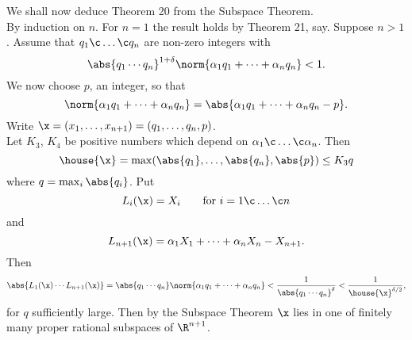 We shall now deduce Theorem 20 from the Subspace Theorem. \\
\pf By induction on $n$.  For $n=1$ the result holds by Theorem 21, say.  Suppose $n>1$.  Assume that $q_1\c \dotsc\c q_n$ are non-zero integers with
\[ \abs{q_1\dotsm q_n}^{1+\delta} \norm{\alpha_1q_1+\dotsb+\alpha_nq_n} < 1 . \]
We now choose $p$, an integer, so that
\[ \norm{\alpha_1q_1+\dotsb+\alpha_nq_n} = \abs{\alpha_1q_1+\dotsb+\alpha_nq_n-p} . \]
Write $\x=(x_1,\dotsc,x_{n+1})=(q_1,\dotsc,q_n,p)$. \\
Let $K_3$, $K_4$ be positive numbers which depend on $\alpha_1\c \dotsc\c \alpha_n$.  Then
\[ \house{\x} = \max(\abs{q_1},\dotsc,\abs{q_n},\abs{p}) \leq K_3 q \]
where $q=\max_i\abs{q_i}$.  Put
\[ L_i(\x) = X_i \qquad\text{for $i=1\c \dotsc\c n$} \]
and
\[ L_{n+1}(\x) = \alpha_1X_1 + \dotsb + \alpha_nX_n - X_{n+1} . \]
Then
\[ \abs{L_1(\x)\dotsm L_{n+1}(\x)} = \abs{q_1\dotsm q_n}\norm{\alpha_1q_1+\dotsb+\alpha_nq_n} < \frac{1}{\abs{q_1\dotsm q_n}^\delta} < \frac{1}{\house{\x}^{\delta/2}} , \]
for $q$ sufficiently large.  Then by the Subspace Theorem $\x$ lies in one of finitely many proper rational subspaces of $\R^{n+1}$.
